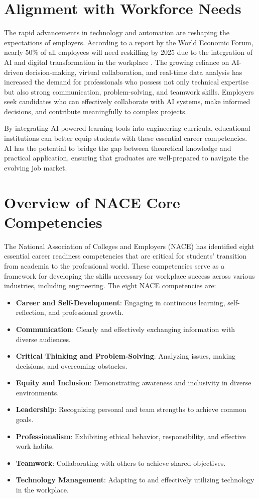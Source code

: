\documentclass[conference]{IEEEtran}
\begin{document}
\section{Alignment with Workforce Needs}
The rapid advancements in technology and automation are reshaping the expectations of employers. According to a report by the World Economic Forum, nearly 50\% of all employees will need reskilling by 2025 due to the integration of AI and digital transformation in the workplace \cite{wef2020future}. The growing reliance on AI-driven decision-making, virtual collaboration, and real-time data analysis has increased the demand for professionals who possess not only technical expertise but also strong communication, problem-solving, and teamwork skills. Employers seek candidates who can effectively collaborate with AI systems, make informed decisions, and contribute meaningfully to complex projects.

By integrating AI-powered learning tools into engineering curricula, educational institutions can better equip students with these essential career competencies. AI has the potential to bridge the gap between theoretical knowledge and practical application, ensuring that graduates are well-prepared to navigate the evolving job market.


\section{Overview of NACE Core Competencies}

The National Association of Colleges and Employers (NACE) has identified eight essential career readiness competencies that are critical for students’ transition from academia to the professional world. These competencies serve as a framework for developing the skills necessary for workplace success across various industries, including engineering. The eight NACE competencies are:

\begin{itemize}
    \item \textbf{Career and Self-Development}: Engaging in continuous learning, self-reflection, and professional growth.
    \item \textbf{Communication}: Clearly and effectively exchanging information with diverse audiences.
    \item \textbf{Critical Thinking and Problem-Solving}: Analyzing issues, making decisions, and overcoming obstacles.
    \item \textbf{Equity and Inclusion}: Demonstrating awareness and inclusivity in diverse environments.
    \item \textbf{Leadership}: Recognizing personal and team strengths to achieve common goals.
    \item \textbf{Professionalism}: Exhibiting ethical behavior, responsibility, and effective work habits.
    \item \textbf{Teamwork}: Collaborating with others to achieve shared objectives.
    \item \textbf{Technology Management}: Adapting to and effectively utilizing technology in the workplace.
\end{itemize}
\end{document}
